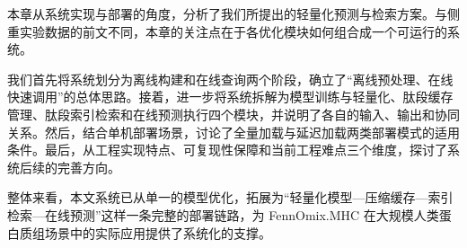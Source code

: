 本章从系统实现与部署的角度，分析了我们所提出的轻量化预测与检索方案。与侧重实验数据的前文不同，本章的关注点在于各优化模块如何组合成一个可运行的系统。

我们首先将系统划分为离线构建和在线查询两个阶段，确立了“离线预处理、在线快速调用”的总体思路。接着，进一步将系统拆解为模型训练与轻量化、肽段缓存管理、肽段索引检索和在线预测执行四个模块，并说明了各自的输入、输出和协同关系。然后，结合单机部署场景，讨论了全量加载与延迟加载两类部署模式的适用条件。最后，从工程实现特点、可复现性保障和当前工程难点三个维度，探讨了系统后续的完善方向。

整体来看，本文系统已从单一的模型优化，拓展为“轻量化模型—压缩缓存—索引检索—在线预测”这样一条完整的部署链路，为 FennOmix.MHC 在大规模人类蛋白质组场景中的实际应用提供了系统化的支撑。